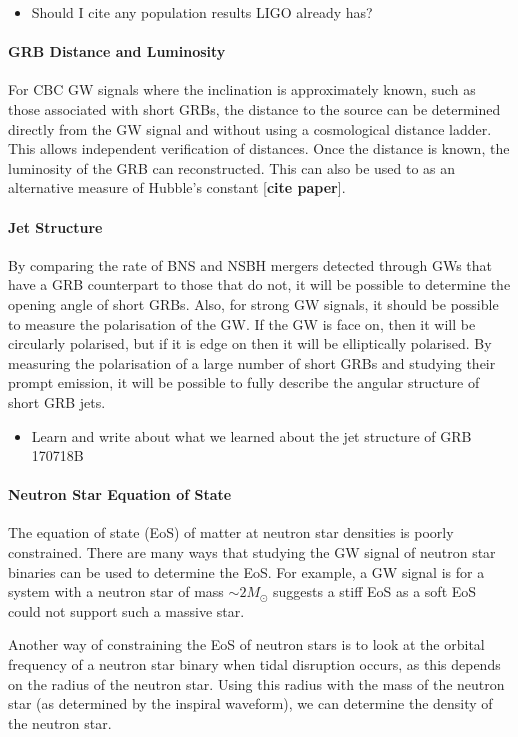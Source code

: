 \documentclass[11pt]{cuthesis}
\begin{document}
\begin{itemize}
\item Should I cite any population results LIGO already has?
\end{itemize}

\paragraph{GRB Distance and Luminosity}
For CBC GW signals where the inclination is approximately known, such as those associated with short GRBs, the distance to the source can be determined directly from the GW signal and without using a cosmological distance ladder. This allows independent verification of distances. Once the distance is known, the luminosity of the GRB can reconstructed. This can also be used to as an alternative measure of Hubble's constant [\textbf{cite paper}]. 

\paragraph{Jet Structure}
By comparing the rate of BNS and NSBH mergers detected through GWs that have a GRB counterpart to those that do not, it will be possible to determine the opening angle of short GRBs. Also, for strong GW signals, it should be possible to measure the polarisation of the GW. If the GW is face on, then it will be circularly polarised, but if it is edge on then it will be elliptically polarised. By measuring the polarisation of a large number of short GRBs and studying their prompt emission, it will be possible to fully describe the angular structure of short GRB jets. 
\begin{itemize}
\item Learn and write about what we learned about the jet structure of GRB 170718B
\end{itemize}

\paragraph{Neutron Star Equation of State}
The equation of state (EoS) of matter at neutron star densities is poorly constrained. There are many ways that studying the GW signal of neutron star binaries can be used to determine the EoS. For example, a GW signal is for a system with a neutron star of mass $\sim 2M_\odot$ suggests a stiff EoS as a soft EoS could not support such a massive star. 

Another way of constraining the EoS of neutron stars is to look at the orbital frequency of a neutron star binary when tidal disruption occurs, as this depends on the radius of the neutron star. Using this radius with the mass of the neutron star (as determined by the inspiral waveform), we can determine the density of the neutron star. 
\end{document}
